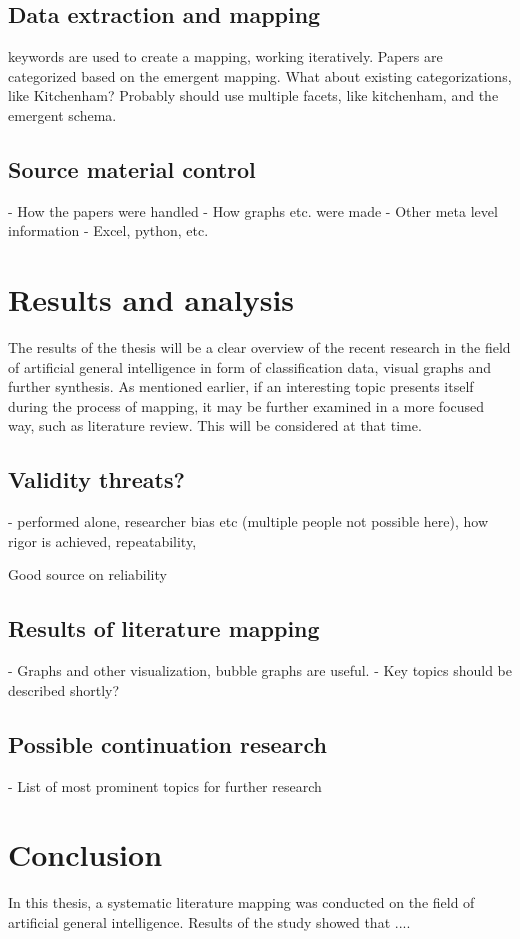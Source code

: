 \documentclass[utf8,english]{gradu3}
\begin{document}
\section{Data extraction and mapping}
keywords are used to create a mapping, working iteratively. Papers are
categorized based on the emergent mapping. What about existing categorizations,
like Kitchenham? Probably should use multiple facets, like kitchenham, and the
emergent schema.

\section{Source material control}
- How the papers were handled
- How graphs etc. were made
- Other meta level information
- Excel, python, etc.

\chapter{Results and analysis}
The results of the thesis will be a clear overview of the recent research in the
field of artificial general intelligence in form of classification data, visual
graphs and further synthesis. As mentioned earlier, if an interesting topic
presents itself during the process of mapping, it may be further examined in a
more focused way, such as literature review. This will be considered at that
time.

\section{Validity threats?}

- performed alone, researcher bias etc (multiple people not possible here),
how rigor is achieved, repeatability, 

Good source on reliability \cite{wohlin2013}

\section{Results of literature mapping}
- Graphs and other visualization, bubble graphs are useful.
- Key topics should be described shortly?

\section{Possible continuation research}

- List of most prominent topics for further research

\chapter{Conclusion}
In this thesis, a systematic literature mapping was conducted on the field of
artificial general intelligence. Results of the study showed that .... 

\printbibliography
\end{document}
